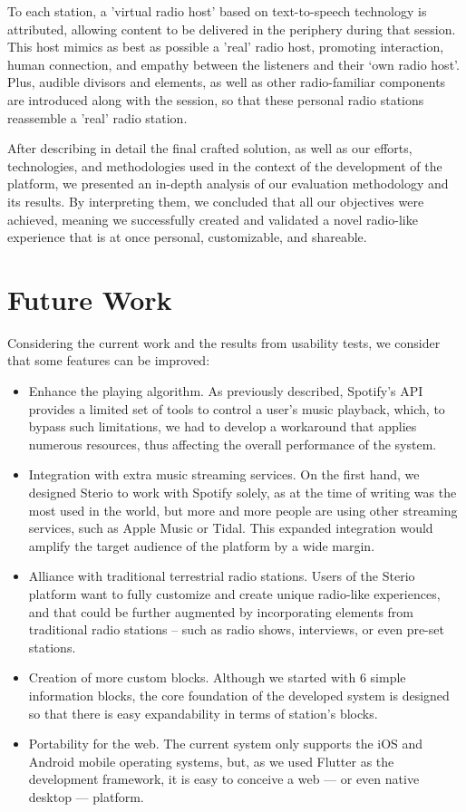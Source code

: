 To each station, a 'virtual radio host' based on text-to-speech technology is attributed, allowing content to be delivered in the periphery during that session. This host mimics as best as possible a 'real' radio host, promoting interaction, human connection, and empathy between the listeners and their ‘own radio host’. Plus, audible divisors and elements, as well as other radio-familiar components are introduced along with the session, so that these personal radio stations reassemble a 'real' radio station.

After describing in detail the final crafted solution, as well as our efforts, technologies, and methodologies used in the context of the development of the platform, we presented an in-depth analysis of our evaluation methodology and its results. By interpreting them, we concluded that all our objectives were achieved, meaning we successfully created and validated a novel radio-like experience that is at once personal, customizable, and shareable.

\section{Future Work}

Considering the current work and the results from usability tests, we consider that some features can be improved:

\begin{itemize}
	\item Enhance the playing algorithm. As previously described, Spotify's \ac{API} provides a limited set of tools to control a user's music playback, which, to bypass such limitations, we had to develop a workaround that applies numerous resources, thus affecting the overall performance of the system.
	\item Integration with extra music streaming services. On the first hand, we designed Sterio to work with Spotify solely, as at the time of writing was the most used in the world, but more and more people are using other streaming services, such as Apple Music or Tidal. This expanded integration would amplify the target audience of the platform by a wide margin.
	\item Alliance with traditional terrestrial radio stations. Users of the Sterio platform want to fully customize and create unique radio-like experiences, and that could be further augmented by incorporating elements from traditional radio stations – such as radio shows, interviews, or even pre-set stations.
	\item Creation of more custom blocks. Although we started with 6 simple information blocks, the core foundation of the developed system is designed so that there is easy expandability in terms of station's blocks.
	\item Portability for the web. The current system only supports the iOS and Android mobile operating systems, but, as we used Flutter as the development framework, it is easy to conceive a web — or even native desktop — platform.
\end{itemize}


